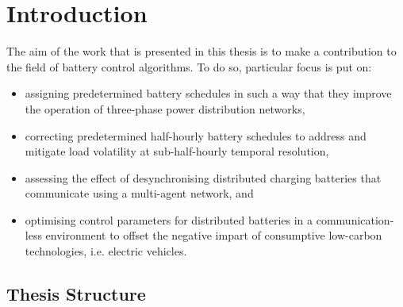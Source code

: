 \chapter{Introduction}
\label{ch-introduction}



The aim of the work that is presented in this thesis is to make a contribution to the field of battery control algorithms.
To do so, particular focus is put on:

\begin{itemize}
	\item assigning predetermined battery schedules in such a way that they improve the operation of three-phase power distribution networks,
	\item correcting predetermined half-hourly battery schedules to address and mitigate load volatility at sub-half-hourly temporal resolution,
	\item assessing the effect of desynchronising distributed charging batteries that communicate using a multi-agent network, and
	\item optimising control parameters for distributed batteries in a communication-less environment to offset the negative impart of consumptive low-carbon technologies, i.e. electric vehicles.
\end{itemize}



%
%
%
%
%
%
%
%
%
%
%
%
%

\section{Thesis Structure}


